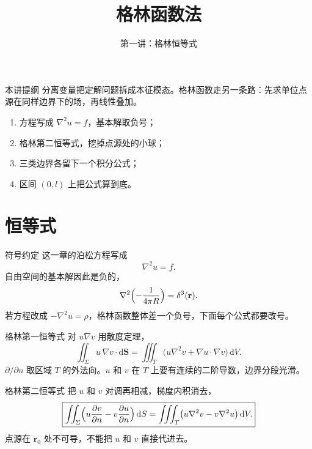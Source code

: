 \documentclass[fontset=windows, chinese, 10pt, xcolor=dvipsnames]{beamer}
\title{格林函数法}
\subtitle{第一讲：格林恒等式}
\begin{document}
\begin{frame}
  \titlepage
\end{frame}

\begin{frame}{本讲提纲}
  分离变量把定解问题拆成本征模态。格林函数走另一条路：先求单位点源在同样边界下的场，再线性叠加。
  \begin{enumerate}
    \item 方程写成 $\nabla^2 u=f$，基本解取负号；
    \item 格林第二恒等式，挖掉点源处的小球；
    \item 三类边界各留下一个积分公式；
    \item 区间 $(0,l)$ 上把公式算到底。
  \end{enumerate}
\end{frame}

\section{恒等式}

\begin{frame}{符号约定}
  这一章的泊松方程写成
  \begin{equation*}
    \boxed{\displaystyle \nabla^2 u=f.}
  \end{equation*}
  自由空间的基本解因此是负的，
  \[
    \nabla^2\Bigl(-\frac{1}{4\pi R}\Bigr)=\delta^3(\mathbf{r}).
  \]
  若方程改成 $-\nabla^2 u=\rho$，格林函数整体差一个负号，下面每个公式都要改号。
\end{frame}

\begin{frame}{格林第一恒等式}
  对 $u\nabla v$ 用散度定理，
  \[
    \iint_{\Sigma} u\,\nabla v\cdot\mathrm{d}\mathbf{S}
    =\iiint_{T}\bigl(u\nabla^2 v+\nabla u\cdot\nabla v\bigr)\,\mathrm{d}V.
  \]
  $\partial/\partial n$ 取区域 $T$ 的外法向。$u$ 和 $v$ 在 $T$ 上要有连续的二阶导数，边界分段光滑。
\end{frame}

\begin{frame}{格林第二恒等式}
  把 $u$ 和 $v$ 对调再相减，梯度内积消去，
  \begin{equation*}
    \boxed{\displaystyle
    \iint_{\Sigma}\Bigl(
      u\frac{\partial v}{\partial n}-v\frac{\partial u}{\partial n}
    \Bigr)\,\mathrm{d}S
    =\iiint_{T}\bigl(u\nabla^2 v-v\nabla^2 u\bigr)\,\mathrm{d}V.}
  \end{equation*}
  点源在 $\mathbf{r}_0$ 处不可导，不能把 $u$ 和 $v$ 直接代进去。
\end{frame}
\end{document}
